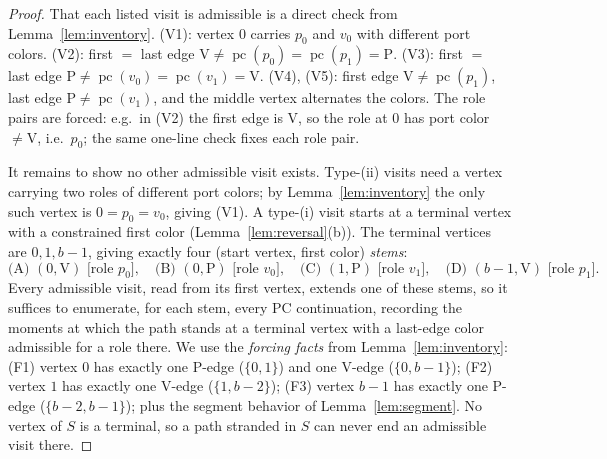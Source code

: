 \documentclass[11pt]{article}
\theoremstyle{definition}
\DeclareMathOperator{\pc}{pc}
\begin{document}
\begin{proof}
That each listed visit is admissible is a direct check from Lemma~\ref{lem:inventory}.
(V1): vertex $0$ carries $p_0$ and $v_0$ with different port colors. (V2): first
$=$ last edge $\mathrm V \ne \pc(p_0) = \pc(p_1) = \mathrm P$. (V3): first $=$ last edge
$\mathrm P \ne \pc(v_0) = \pc(v_1) = \mathrm V$. (V4), (V5): first edge $\mathrm V \ne
\pc(p_1)$, last edge $\mathrm P \ne \pc(v_1)$, and the middle vertex alternates the
colors. The role pairs are forced: e.g.\ in (V2) the first edge is $\mathrm V$, so the
role at $0$ has port color $\ne \mathrm V$, i.e.\ $p_0$; the same one-line check fixes
each role pair.

It remains to show no other admissible visit exists. Type-(ii) visits need a vertex
carrying two roles of different port colors; by Lemma~\ref{lem:inventory} the only such
vertex is $0 = p_0 = v_0$, giving (V1). A type-(i) visit starts at a terminal vertex
with a constrained first color (Lemma~\ref{lem:reversal}(b)). The terminal vertices are
$0, 1, b-1$, giving exactly four (start vertex, first color) \emph{stems}:
\[
\text{(A) } (0, \mathrm V) \text{ [role } p_0\text{]}, \quad
\text{(B) } (0, \mathrm P) \text{ [role } v_0\text{]}, \quad
\text{(C) } (1, \mathrm P) \text{ [role } v_1\text{]}, \quad
\text{(D) } (b-1, \mathrm V) \text{ [role } p_1\text{]}.
\]
Every admissible visit, read from its first vertex, extends one of these stems, so it
suffices to enumerate, for each stem, every PC continuation, recording the moments at
which the path stands at a terminal vertex with a last-edge color admissible for a role
there. We use the \emph{forcing facts} from Lemma~\ref{lem:inventory}:
(F1) vertex $0$ has exactly one P-edge ($\{0,1\}$) and one V-edge ($\{0,b-1\}$);
(F2) vertex $1$ has exactly one V-edge ($\{1,b-2\}$);
(F3) vertex $b-1$ has exactly one P-edge ($\{b-2,b-1\}$);
plus the segment behavior of Lemma~\ref{lem:segment}. No vertex of $S$ is a terminal,
so a path stranded in $S$ can never end an admissible visit there.


\end{proof}
\end{document}
